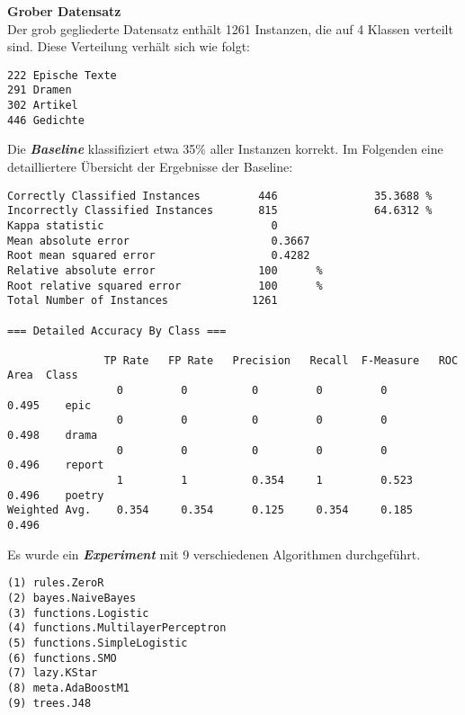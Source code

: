 \documentclass[]{article}
\begin{document}
\textbf{Grober Datensatz}\\
Der grob gegliederte Datensatz enthält 1261 Instanzen, die auf 4 Klassen
verteilt sind. Diese Verteilung verhält sich wie folgt:

\vspace{4 mm}\begin{verbatim}
222 Epische Texte
291 Dramen
302 Artikel
446 Gedichte
\end{verbatim}\vspace{4 mm}

Die \textbf{\emph{Baseline}} klassifiziert etwa 35\% aller Instanzen
korrekt. Im Folgenden eine detailliertere Übersicht der Ergebnisse der
Baseline:


\vspace{4 mm}\begin{verbatim}
Correctly Classified Instances         446               35.3688 %
Incorrectly Classified Instances       815               64.6312 %
Kappa statistic                          0     
Mean absolute error                      0.3667
Root mean squared error                  0.4282
Relative absolute error                100      %
Root relative squared error            100      %
Total Number of Instances             1261     

=== Detailed Accuracy By Class ===

               TP Rate   FP Rate   Precision   Recall  F-Measure   ROC Area  Class
                 0         0          0         0         0          0.495    epic
                 0         0          0         0         0          0.498    drama
                 0         0          0         0         0          0.496    report
                 1         1          0.354     1         0.523      0.496    poetry
Weighted Avg.    0.354     0.354      0.125     0.354     0.185      0.496
\end{verbatim}\vspace{4 mm}

Es wurde ein \textbf{\emph{Experiment}} mit 9 verschiedenen Algorithmen
durchgeführt.

\vspace{4 mm}\begin{verbatim}
(1) rules.ZeroR
(2) bayes.NaiveBayes
(3) functions.Logistic
(4) functions.MultilayerPerceptron 
(5) functions.SimpleLogistic
(6) functions.SMO
(7) lazy.KStar
(8) meta.AdaBoostM1
(9) trees.J48
\end{verbatim}\vspace{4 mm}
\end{document}
